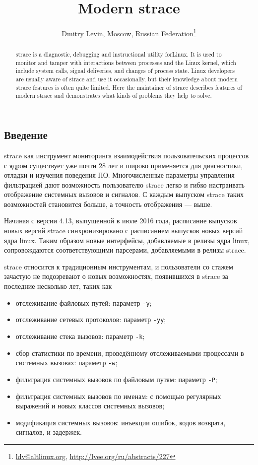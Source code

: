 \documentclass[10pt, a5paper]{article}
\begin{document}
\title{Modern strace}
\author{Dmitry Levin, Moscow, Russian Federation\footnote{\url{ldv@altlinux.org}, \url{http://lvee.org/ru/abstracts/227}}}
\maketitle
\begin{abstract}
strace is a diagnostic, debugging and instructional utility for\linebreak Linux. It is used to monitor and tamper with interactions between processes and the Linux kernel, which include system calls, signal deliveries, and changes of process state. Linux developers are usually aware of strace and use it occasionally, but their know\-ledge about modern strace features is often quite limited. Here the maintainer of strace describes features of modern strace and demonstrates what kinds of problems they help to solve.
\end{abstract}
\subsection*{Введение} 
strace как инструмент мониторинга взаимодействия пользовательских процессов с ядром существует уже почти 28 лет и широко применяется для диагностики, отладки и изучения поведения ПО. Многочисленные параметры управления фильтрацией дают возможность пользователю strace легко и гибко настраивать отображение системных вызовов и сигналов. С каждым выпуском strace таких возможностей становится больше, а точность отображения --- выше.

Начиная с версии 4.13, выпущенной в июле 2016 года, расписание выпусков новых версий strace синхронизировано с расписанием выпусков новых версий ядра linux. Таким образом новые интерфейсы, добавляемые в релизы ядра linux, сопровождаются соответствующими парсерами, добавляемыми в релизы strace.

strace относится к традиционным инструментам, и пользователи со стажем зачастую не подозревают о новых возможностях, появившихся в strace за последние несколько лет, таких как 
\begin{itemize} 
\item отслеживание файловых путей: параметр \texttt{-y}; 
\item отслеживание сетевых протоколов: параметр \texttt{-yy}; 
\item отслеживание стека вызовов: параметр \texttt{-k}; 
\item сбор статистики по времени, проведённому отслеживаемыми процессами в системных вызовах: параметр \texttt{-w}; 
\item фильтрация системных вызовов по файловым путям: параметр \texttt{-P}; 
\item фильтрация системных вызовов по именам: с помощью регулярных выражений и новых классов системных вызовов; 
\item модификация системных вызовов: инъекции ошибок, кодов возврата, сигналов, и задержек. 
\end{itemize}
\end{document}
